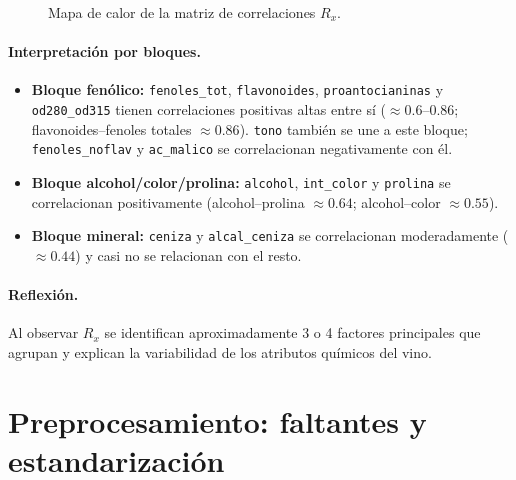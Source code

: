 \documentclass[11pt,a4paper]{article}
\newcommand{\var}[1]{\texttt{#1}}
\begin{document}
\begin{figure}[H]
\caption{Mapa de calor de la matriz de correlaciones $R_x$.}
\label{fig:heat}
\end{figure}

\paragraph{Interpretación por bloques.}
\begin{itemize}[leftmargin=*]
  \item \textbf{Bloque fenólico:} \var{fenoles\_tot}, \var{flavonoides}, \var{proantocianinas} y \var{od280\_od315} tienen correlaciones positivas altas entre sí ($\approx 0.6$--$0.86$; flavonoides--fenoles totales $\approx 0.86$). \var{tono} también se une a este bloque; \var{fenoles\_noflav} y \var{ac\_malico} se correlacionan negativamente con él.
  \item \textbf{Bloque alcohol/color/prolina:} \var{alcohol}, \var{int\_color} y \var{prolina} se correlacionan positivamente (alcohol--prolina $\approx 0.64$; alcohol--color $\approx 0.55$).
  \item \textbf{Bloque mineral:} \var{ceniza} y \var{alcal\_ceniza} se correlacionan moderadamente ($\approx 0.44$) y casi no se relacionan con el resto.
\end{itemize}

\paragraph{Reflexión.} Al observar $R_x$ se identifican aproximadamente 3 o 4 factores principales que agrupan y explican la variabilidad de los atributos químicos del vino.

\section{Preprocesamiento: faltantes y estandarización}
\end{document}
